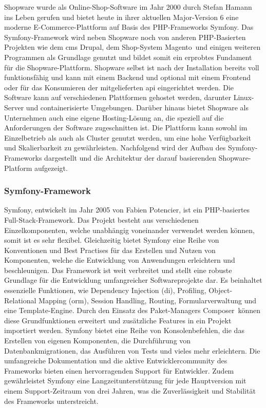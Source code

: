 Shopware wurde als Online-Shop-Software im Jahr 2000 durch Stefan Hamann ins Leben gerufen
und bietet heute in ihrer aktuellen Major-Version 6 eine moderne E-Commerce-Plattform auf Basis des PHP-Frameworks
\glqq Symfony\grqq.
Das Symfony-Framework wird neben Shopware noch von anderen PHP-Basierten Projekten wie dem \acrshort{cms}
\glqq Drupal\grqq, dem Shop-System \glqq Magento\grqq\ und einigen weiteren Programmen
als Grundlage genutzt und bildet somit ein erprobtes Fundament für die Shopware-Plattform.
Shopware selbst ist nach der Installation bereits voll funktionsfähig und kann mit einem Backend und optional
mit einem Frontend oder für das Konsumieren der mitgelieferten \acrshort{api} eingerichtet werden.
Die Software kann auf verschiedenen Plattformen gehostet werden, darunter Linux-Server und containerisierte Umgebungen.
Darüber hinaus bietet Shopware als Unternehmen auch eine eigene Hosting-Lösung an, die speziell auf die Anforderungen
der Software zugeschnitten ist.
Die Plattform kann sowohl im Einzelbetrieb als auch als Cluster genutzt werden, um eine hohe Verfügbarkeit und
Skalierbarkeit zu gewährleisten.
Nachfolgend wird der Aufbau des Symfony-Frameworks dargestellt und die Architektur der darauf basierenden
Shopware-Platform aufgezeigt.

\subsubsection{Symfony-Framework}

Symfony, entwickelt im Jahr 2005 von Fabien Potencier, ist ein PHP-basiertes Full-Stack-Framework.
Das Projekt besteht aus verschiedenen Einzelkomponenten, welche unabhängig voneinander verwendet werden können, somit
ist es sehr flexibel.
Gleichzeitig bietet Symfony eine Reihe von Konventionen und Best Practises für das Erstellen und Nutzen von Komponenten,
welche die Entwicklung von Anwendungen erleichtern und beschleunigen.
Das Framework ist weit verbreitet und stellt eine robuste Grundlage für die Entwicklung umfangreicher Softwareprojekte
dar.
Es beinhaltet essenzielle Funktionen, wie Dependency Injection (\acrshort{di}), Profiling, Object-Relational Mapping
(\acrshort{orm}), Session Handling, Routing, Formularverwaltung und eine Template-Engine.
Durch den Einsatz des Paket-Managers \glqq Composer\grqq\ können diese Grundfunktionen erweitert und zusätzliche
Features in ein Projekt importiert werden.
Symfony bietet eine Reihe von Konsolenbefehlen, die das Erstellen von eigenen Komponenten, die Durchführung von
Datenbankmigrationen, das Ausführen von Tests und vieles mehr erleichtern.
Die umfangreiche Dokumentation und die aktive Entwicklercommunity des Frameworks bieten einen hervorragenden Support
für Entwickler.
Zudem gewährleistet Symfony eine Langzeitunterstützung für jede Hauptversion mit einem Support-Zeitraum von drei Jahren,
was die Zuverlässigkeit und Stabilität des Frameworks unterstreicht.

